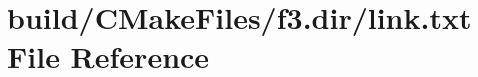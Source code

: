 \hypertarget{f3_8dir_2link_8txt}{}\section{build/\+C\+Make\+Files/f3.dir/link.txt File Reference}
\label{f3_8dir_2link_8txt}
